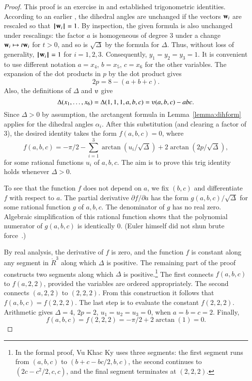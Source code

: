\begin{proof}
  This proof is an exercise in 
  and established trigonometric identities.  According to an earlier
  , the dihedral angles are unchanged if the
  vectors ${\mathbf w}_i$ are rescaled so that ${{\hskip0.1em|\hskip-0.15em|\hskip0.1em}{\mathbf w}_i{\hskip0.1em|\hskip-0.15em|\hskip0.1em}}=1$.  By
  inspection, the given formula is also unchanged under rescalings:
  the factor $a$ is homogeneous of degree $3$ under a change ${\mathbf w}_i
  \mapsto t {\mathbf w}_i$ for $t>0$, and so is $\sqrt{\Delta}$ by the formula
  for $\Delta$.  Thus, without loss of generality, ${{\hskip0.1em|\hskip-0.15em|\hskip0.1em}{\mathbf w}_i{\hskip0.1em|\hskip-0.15em|\hskip0.1em}}=1$ for $i=1,2,3$.  Consequently, $y_1=y_2=y_3=1$.  It is convenient to
  use different notation $a=x_4$, $b=x_5$, $c=x_6$ for the other
  variables. The expansion of the dot products in $p$ by the dot
  product  gives
\[ 2 p = 8 - (a+b+c).\] 
Also, the definitions of $\Delta$ and $\ups$ give
\[ \Delta(x_1,\ldots,x_6) = \Delta(1,1,1,a,b,c) =
\ups(a,b,c) - a b c.\] 
Since $\Delta>0$ by assumption, the arctangent formula
in Lemma~\ref{lemma:dihform} 
applies for the dihedral angles $\alpha_i$.  After
this substitution (and clearing a factor of $3$),  %
the desired identity takes the form $f(a,b,c)=0$, where
\[ 
f(a,b,c)= -\pi/2 - \sum_{i=1}^3\arctan(u_i/\sqrt{\Delta}) +
2\arctan(2 p/\sqrt{\Delta}),
\] 
for some rational functions $u_i$ of $a,b,c$.  The aim is to prove
this trig identity holds whenever $\Delta>0$.

To see that the function $f$ does not depend on $a$, 
we fix $(b,c)$ and differentiate $f$ with respect to $a$.  The partial
derivative $\partial f/\partial a$ has the form
$g(a,b,c)/\sqrt{\Delta}$ for some rational function $g$ of $a,b,c$.
The denominator of $g$ has no real zero.  Algebraic simplification of
this rational function shows that the polynomial numerator of
$g(a,b,c)$ is identically $0$.  (Euler himself did not shun brute
force~\cite{Euler}.)

By real analysis, the derivative of $f$ is zero, and the function $f$
is constant along any segment in $\ring{R}^3$ along which $\Delta$ is
positive.  The remaining part of the proof constructs two segments
along which $\Delta$ is positive.\footnote{In the formal proof, Vu
  Khac Ky uses three segments: the first segment runs from $(a,b,c)$
  to $(b+c-b c/2,b,c)$, the second continues to $(2c - c^2/2,c,c)$,
  and the final segment terminates at $(2,2,2)$.}   The
first connects $f(a,b,c)$ to $f(a,2,2)$, provided the variables are
ordered appropriately.  The second connects $(a,2,2)$ to $(2,2,2)$.
From this construction it follows that $f(a,b,c)=f(2,2,2)$.  The last
step is to evaluate the constant $f(2,2,2)$.  Arithmetic gives
$\Delta=4$, $2p= 2$, $u_1=u_2=u_3 =0$, when $a=b=c=2$.  Finally,
\[ f(a,b,c)= f(2,2,2) = -\pi/2 + 2\arctan(1)
  =0.\] 



\end{proof}
